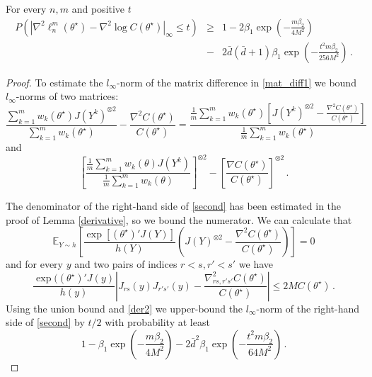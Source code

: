 \documentclass[twoside,11pt]{article}
\def\llnm{\ell_n^m}
\def\th{\theta}
\def\Ex{\mathbb{E}}
\def\ths{\th^\star}
\def\rs{_{rs}}
\def\grad{\nabla}
\def\hess{\nabla^2}
\def\bbd{\bar{d}}
\begin{document}
\begin{lemma}
\label{matrix_diff}
For every $n,m$ and positive $t$
\begin{eqnarray}
\label{mat_diff1}
P \left( \left| \hess \llnm (\ths) - \hess \log C(\ths)\right| _ \infty \leq t \right) &\geq& 1-2 \beta_1 \exp \left(  -  \frac{m \beta_2 }{4 M^2}                     \right)  \nonumber
\\ &-& 2 \bbd (\bbd+1)  \beta_1 \exp \left(  -  \frac{ t^2 m \beta_2  }{256 M^2} \right)\,.
\end{eqnarray}
\end{lemma}
\begin{proof}
To estimate the  $l_\infty$-norm of the matrix difference  in \eqref{mat_diff1} we bound $l_\infty$-norms of two matrices:
\begin{equation}
\label{second}
\frac{\sum\limits_{k=1}^{m} w_k(\ths) J(Y^k)^{\otimes 2}}
                 {\sum\limits_{k=1}^{m} w_k(\ths)} - \frac{\hess C(\ths)}{C(\ths)}
= \frac{\frac{1}{m} \sum\limits_{k=1}^{m} w_k(\ths) \left[J(Y^k)^{\otimes 2}
 - \frac{\hess C(\ths)}{C(\ths)} \right]}
                 {\frac{1}{m} \sum\limits_{k=1}^{m} w_k(\ths)}
\end{equation}
and 
\begin{equation}
\label{first}
\left[ \frac{\frac{1}{m} \sum\limits_{k=1}^{m} w_k(\th) J(Y^k)}
                 {\frac{1}{m} \sum\limits_{k=1}^{m} w_k(\th) } \right]^{\otimes 2}
- \left[ \frac{\grad C(\ths)}
                 { C(\ths)} \right]^{\otimes 2}\, .
\end{equation}

The denominator of the right-hand side of \eqref{second} has been estimated in the proof of 
Lemma \ref{derivative}, so we bound the numerator. We can calculate that 
\[
\Ex _{Y \sim h} \left[\frac{\exp \left[(\ths)'J(Y)\right]}{h(Y)} \left( J(Y) ^{\otimes 2} - \frac{\hess C(\ths)}{C(\ths)} \right) \right] =0
\]
and for every $y$ and two pairs of indices $r<s, r'<s'$ we have
\[
\frac{\exp((\ths)'J(y)}{h(y)} \left| J \rs (y) J_{r's'} (y) - \frac{\hess _{rs,r's'} C(\ths)}{C(\ths)}
\right| \leq 2 M C(\ths)\,.
\]
Using the union bound and \eqref{der2} we upper-bound the $l_\infty$-norm of the right-hand side of \eqref{second} by $t/2$ with probability at least 
\[1-\beta_1 \exp \left(  -  \frac{m \beta_2  }{4 M^2}                     \right)  -2 \bbd  ^2 \beta_1 \exp \left(  -  \frac{ t^2 m \beta_2  }{64 M^2} \right)\,.\]



\end{proof}
\end{document}
